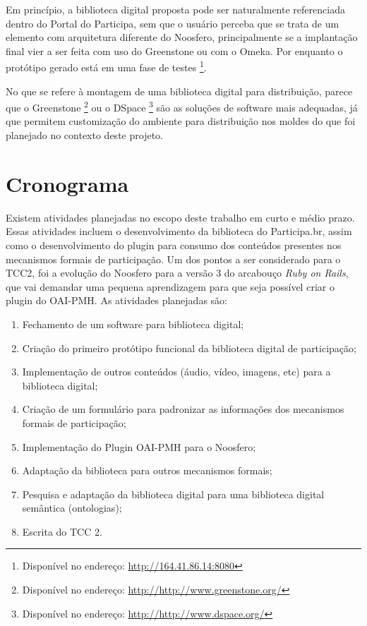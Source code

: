 Em princípio, a biblioteca digital proposta pode ser naturalmente referenciada dentro do Portal do Participa, sem que o usuário perceba que se trata de um elemento com arquitetura diferente do Noosfero, principalmente se a implantação final vier a ser feita com uso do Greenstone ou com o Omeka. Por enquanto o protótipo gerado está em uma fase de testes \footnote{Disponível no endereço: \url{http://164.41.86.14:8080}}.

No que se refere à montagem de uma biblioteca digital para distribuição, parece que o Greenstone \footnote{Disponível no endereço: \url{http://http://www.greenstone.org/}} ou o DSpace \footnote{Disponível no endereço: \url{http://http://www.dspace.org/}} são as soluções de software mais adequadas, já que permitem customização do ambiente para distribuição nos moldes do que foi planejado no contexto deste projeto.


\section{Cronograma}

Existem atividades planejadas no escopo deste trabalho em curto e médio prazo. Essas atividades incluem o desenvolvimento da biblioteca do Participa.br, assim como o desenvolvimento do plugin para consumo dos conteúdos presentes nos mecanismos formais de participação. Um dos pontos a ser considerado para o TCC2, foi a evolução do Noosfero para a versão 3 do arcabouço \textit{Ruby on Rails}, que vai demandar uma pequena aprendizagem para que seja possível criar o plugin do OAI-PMH. As atividades planejadas são:

\begin{enumerate}
\item Fechamento de um software para biblioteca digital;
\item Criação do primeiro protótipo funcional da biblioteca digital de participação;
\item Implementação de outros conteúdos (áudio, vídeo, imagens, etc) para a biblioteca digital;
\item Criação de um formulário para padronizar as informações dos mecanismos formais de participação;
\item Implementação do Plugin OAI-PMH para o Noosfero;
\item Adaptação da biblioteca para outros mecanismos formais;
\item Pesquisa e adaptação da biblioteca digital para uma biblioteca digital semântica (ontologias);
\item Escrita do TCC 2.
\end{enumerate}

